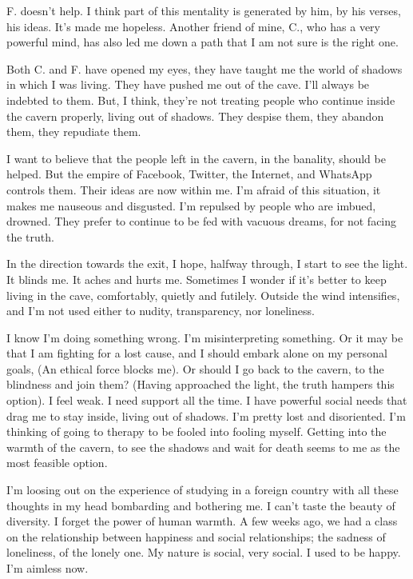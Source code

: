 \documentclass[]{book}
\begin{document}
F. doesn't help. I think part of this mentality is generated by him, by his verses, his ideas. It's made me hopeless. Another friend of mine, C., who has a very powerful mind, has also led me down a path that I am not sure is the right one.

Both C. and F. have opened my eyes, they have taught me the world of shadows in which I was living. They have pushed me out of the cave. I'll always be indebted to them. But, I think, they're not treating people who continue inside the cavern properly, living out of shadows. They despise them, they abandon them, they repudiate them.

I want to believe that the people left in the cavern, in the banality, should be helped. But the empire of Facebook, Twitter, the Internet, and WhatsApp controls them. Their ideas are now within me. I'm afraid of this situation, it makes me nauseous and disgusted. I'm repulsed by people who are imbued, drowned. They prefer to continue to be fed with vacuous dreams, for not facing the truth.

In the direction towards the exit, I hope, halfway through, I start to see the light. It blinds me. It aches and hurts me. Sometimes I wonder if it's better to keep living in the cave, comfortably, quietly and futilely. Outside the wind intensifies, and I'm not used either to nudity, transparency, nor loneliness.

I know I'm doing something wrong. I'm misinterpreting something. Or it may be that I am fighting for a lost cause, and I should embark alone on my personal goals, (An ethical force blocks me). Or should I go back to the cavern, to the blindness and join them? (Having approached the light, the truth hampers this option). I feel weak. I need support all the time. I have powerful social needs that drag me to stay inside, living out of shadows. I'm pretty lost and disoriented. I'm thinking of going to therapy to be fooled into fooling myself. Getting into the warmth of the cavern, to see the shadows and wait for death seems to me as the most feasible option.

I'm loosing out on the experience of studying in a foreign country with all these thoughts in my head bombarding and bothering me. I can't taste the beauty of diversity. I forget the power of human warmth. A few weeks ago, we had a class on the relationship between happiness and social relationships; the sadness of loneliness, of the lonely one. My nature is social, very social. I used to be happy. I'm aimless now.
\end{document}
